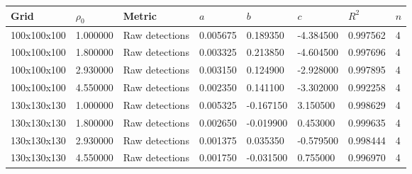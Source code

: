 \begin{tabular}{llllllll}
\toprule
Grid & $\rho_0$ & Metric & $a$ & $b$ & $c$ & $R^2$ & $n$ \\
\midrule
100x100x100 & 1.000000 & Raw detections & 0.005675 & 0.189350 & -4.384500 & 0.997562 & 4 \\
100x100x100 & 1.800000 & Raw detections & 0.003325 & 0.213850 & -4.604500 & 0.997696 & 4 \\
100x100x100 & 2.930000 & Raw detections & 0.003150 & 0.124900 & -2.928000 & 0.997895 & 4 \\
100x100x100 & 4.550000 & Raw detections & 0.002350 & 0.141100 & -3.302000 & 0.992258 & 4 \\
130x130x130 & 1.000000 & Raw detections & 0.005325 & -0.167150 & 3.150500 & 0.998629 & 4 \\
130x130x130 & 1.800000 & Raw detections & 0.002650 & -0.019900 & 0.453000 & 0.999635 & 4 \\
130x130x130 & 2.930000 & Raw detections & 0.001375 & 0.035350 & -0.579500 & 0.998444 & 4 \\
130x130x130 & 4.550000 & Raw detections & 0.001750 & -0.031500 & 0.755000 & 0.996970 & 4 \\
\bottomrule
\end{tabular}
